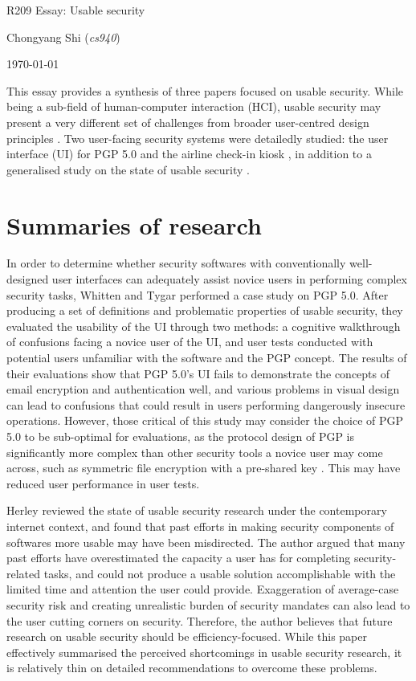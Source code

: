 \documentclass[11pt]{article}
\begin{document}
\centerline{\Large R209 Essay:  Usable security}
\vspace{2em}
\centerline{\large Chongyang Shi (\emph{cs940})}
\vspace{1em}
\centerline{\large \today}
\vspace{1em}

This essay provides a synthesis of three papers focused on usable security. While being a sub-field of human-computer interaction (HCI), usable security may present a very different set of challenges from broader user-centred design principles \cite[Abs.]{whitten1999johnny}. Two user-facing security systems were detailedly studied: the user interface (UI) for PGP 5.0 \cite{whitten1999johnny} and the airline check-in kiosk \cite{glass2016usability}, in addition to a generalised study on the state of usable security \cite{herley2014more}.

\section{Summaries of research}

In order to determine whether security softwares with conventionally well-designed user interfaces can adequately assist novice users in performing complex security tasks, Whitten and Tygar \cite{whitten1999johnny} performed a case study on PGP 5.0. After producing a set of definitions and problematic properties of usable security, they evaluated the usability of the UI through two methods: a cognitive walkthrough of confusions facing a novice user of the UI, and user tests conducted with potential users unfamiliar with the software and the PGP concept. The results of their evaluations show that PGP 5.0's UI fails to demonstrate the concepts of email encryption and authentication well, and various problems in visual design can lead to confusions that could result in users performing dangerously insecure operations. However, those critical of this study may consider the choice of PGP 5.0 to be sub-optimal for evaluations, as the protocol design of PGP is significantly more complex than other security tools a novice user may come across, such as symmetric file encryption with a pre-shared key \cite{gujrati2013usability}. This may have reduced user performance in user tests.

Herley \cite{herley2014more} reviewed the state of usable security research under the contemporary internet context, and found that past efforts in making security components of softwares more usable may have been misdirected. The author argued that many past efforts have overestimated the capacity a user has for completing security-related tasks, and could not produce a usable solution accomplishable with the limited time and attention the user could provide. Exaggeration of average-case security risk \cite[2.3]{herley2014more} and creating unrealistic burden of security mandates \cite[1.3]{herley2014more} can also lead to the user cutting corners on security. Therefore, the author believes that future research on usable security should be efficiency-focused. While this paper effectively summarised the perceived shortcomings in usable security research, it is relatively thin on detailed recommendations to overcome these problems.
\end{document}
